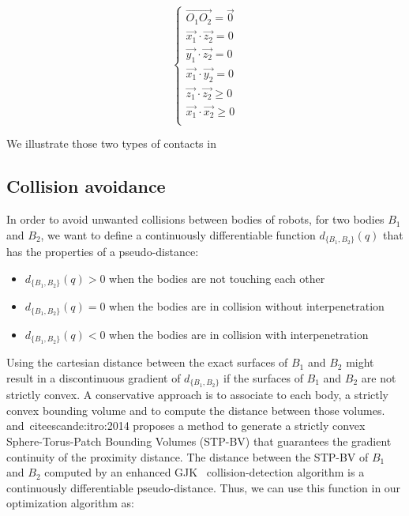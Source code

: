 \begin{equation}
\label{eq:fixed_contact}
\boxed{\left\{
  \begin{array}{l}
    \overrightarrow{O_1O_2} = \vec{0}\\
    \vec{x_1}\cdot\vec{z_2} = 0\\
    \vec{y_1}\cdot\vec{z_2} = 0\\
    \vec{x_1}\cdot\vec{y_2} = 0\\
    \vec{z_1}\cdot\vec{z_2} \geq 0\\
    \vec{x_1}\cdot\vec{x_2} \geq 0\\
  \end{array}
  \right.}
\end{equation}

We illustrate those two types of contacts in~



\subsection{Collision avoidance}
\label{sub:collision_avoidance}


In order to avoid unwanted collisions between bodies of robots, for two bodies $B_1$ and $B_2$, we want to define a continuously differentiable function $d_{\{B_1, B_2\}}(q)$ that has the properties of a pseudo-distance:
\begin{itemize}
  \item $d_{\{B_1, B_2\}}(q) > 0$ when the bodies are not touching each other
  \item $d_{\{B_1, B_2\}}(q) = 0$ when the bodies are in collision without interpenetration
  \item $d_{\{B_1, B_2\}}(q) < 0$ when the bodies are in collision with interpenetration
\end{itemize}

Using the cartesian distance between the exact surfaces of $B_1$ and $B_2$ might result in a discontinuous gradient of $d_{\{B_1, B_2\}}$ if the surfaces of $B_1$ and $B_2$ are not strictly convex.
A conservative approach is to associate to each body, a strictly convex bounding volume and to compute the distance between those volumes.
\cite{escande:humanoids:2007} and~cite{escande:itro:2014} proposes a method to generate a strictly convex Sphere-Torus-Patch Bounding Volumes (STP-BV) that guarantees the gradient continuity of the proximity distance.
The distance between the STP-BV of $B_1$ and $B_2$ computed by an enhanced GJK~\cite{gilbert-1988a} collision-detection algorithm is a continuously differentiable pseudo-distance.
Thus, we can use this function in our optimization algorithm as:


